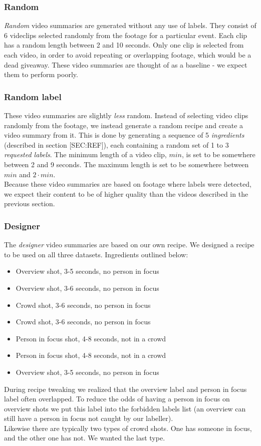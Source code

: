 \subsubsection{Random}
%
\textit{Random} video summaries are generated without any use of labels. They consist of 6 videclips selected randomly from the footage for a particular event. Each clip has a random length between 2 and 10 seconds. Only one clip is selected from each video, in order to avoid repeating or overlapping footage, which would be a dead giveaway. These video summaries are thought of as a baseline - we expect them to perform poorly.
%
\subsubsection{Random label}
%
These video summaries are slightly \textit{less} random. Instead of selecting video clips randomly from the footage, we instead generate a random recipe and create a video summary from it. This is done by generating a sequence of 5 \textit{ingredients} (described in section [SEC:REF]), each containing a random set of 1 to 3 \textit{requested labels}. The minimum length of a video clip, $min$, is set to be somewhere between 2 and 9 seconds. The maximum length is set to be somewhere between $min$ and $2 \cdot min$.\\
Because these video summaries are based on footage where labels were detected, we expect their content to be of higher quality than the videos described in the previous section.
%
\subsubsection{Designer}
%
The \textit{designer} video summaries are based on our own recipe.
We designed a recipe to be used on all three datasets. Ingredients outlined below:
\begin{itemize}
\item Overview shot, 3-5 seconds, no person in focus
\item Overview shot, 3-6 seconds, no person in focus
\item Crowd shot, 3-6 seconds, no person in focus
\item Crowd shot, 3-6 seconds, no person in focus
\item Person in focus shot, 4-8 seconds, not in a crowd
\item Person in focus shot, 4-8 seconds, not in a crowd
\item Overview shot, 3-5 seconds, no person in focus
\end{itemize}
%
During recipe tweaking we realized that the overview label and person in focus label often overlapped. To reduce the odds of having a person in focus on overview shots we put this label into the forbidden labels list (an overview can still have a person in focus not caught by our labeller).\\
Likewise there are typically two types of crowd shots. One has someone in focus, and the other one has not. We wanted the last type.
%
